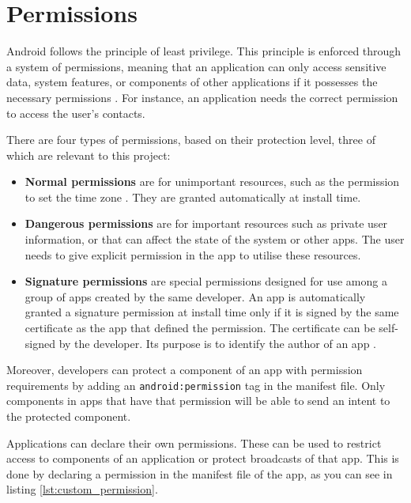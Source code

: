     \section{Permissions}
        \label{sec:permissions}
        
    Android follows the principle of least privilege. This principle is enforced through a system of permissions, meaning that an application can only access sensitive data, system features, or components of other applications if it possesses the necessary permissions \cite{permissions_guide}. For instance, an application needs the correct permission to access the user’s contacts. 
    
    There are four types of permissions, based on their protection level, three of which are relevant to this project:
    \begin{itemize} [noitemsep]
        \item \textbf{Normal permissions} are for unimportant resources, such as the permission to set the time zone \cite{permissions_guide}. They are granted automatically at install time.
        \item \textbf{Dangerous permissions} are for important resources such as private user information, or that can affect the state of the system or other apps. The user needs to give explicit permission in the app to utilise these resources.
        \item \textbf{Signature permissions} are special permissions designed for use among a group of apps created by the same developer. An app is automatically granted a signature permission at install time only if it is signed by the same certificate as the app that defined the permission. The certificate can be self-signed by the developer. Its purpose is to identify the author of an app \cite{define_custom_permission}.
    \end{itemize}
    
    Moreover, developers can protect a component of an app with permission requirements by adding an \lstinline|android:permission| tag in the manifest file. Only components in apps that have that permission will be able to send an intent to the protected component.
        
    Applications can declare their own permissions. These can be used to restrict access to components of an application or protect broadcasts of that app. This is done by declaring a permission in the manifest file of the app, as you can see in listing \ref{lst:custom_permission}.
    
